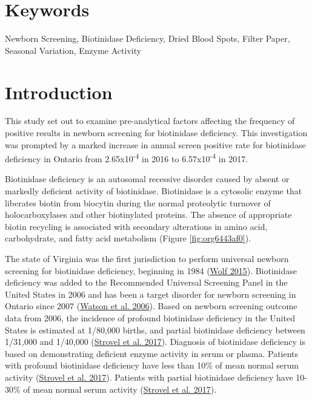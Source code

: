 \documentclass[review]{elsarticle}
\begin{document}
\section*{Keywords}
\label{sec:org08a5d07}
Newborn Screening, Biotinidase Deficiency, Dried Blood Spots, Filter
Paper, Seasonal Variation, Enzyme Activity
\section*{Introduction}
\label{sec:org8dc339e}
This study set out to examine pre-analytical factors affecting the
frequency of positive results in newborn screening for biotinidase
deficiency. This investigation was prompted by a marked increase in
annual screen positive rate for biotinidase deficiency in Ontario from
2.65x10\textsuperscript{-4} in 2016 to 6.57x10\textsuperscript{-4} in 2017.

Biotinidase deficiency is an autosomal recessive disorder caused by
absent or markedly deficient activity of biotinidase.  Biotinidase is
a cytosolic enzyme that liberates biotin from biocytin during the
normal proteolytic turnover of holocarboxylases and other biotinylated
proteins. The absence of appropriate biotin recycling is associated
with secondary alterations in amino acid, carbohydrate, and fatty acid
metabolism (Figure \ref{fig:org6443af0}).

The state of Virginia was the first jurisdiction to perform universal
newborn screening for biotinidase deficiency, beginning in 1984 (\hyperlink{citeproc_bib_item_11}{Wolf 2015}). Biotinidase deficiency was added to the Recommended
Universal Screening Panel in the United States in 2006 and has been a
target disorder for newborn screening in Ontario since 2007 (\hyperlink{citeproc_bib_item_9}{Watson et al. 2006}).  Based on newborn screening outcome data from
2006, the incidence of profound biotinidase deficiency in the United
States is estimated at 1/80,000 births, and partial biotinidase
deficiency between 1/31,000 and 1/40,000 (\hyperlink{citeproc_bib_item_6}{Strovel et al. 2017}). Diagnosis of biotinidase deficiency is based on
demonstrating deficient enzyme activity in serum or plasma. Patients
with profound biotinidase deficiency have less than 10\% of mean normal
serum activity (\hyperlink{citeproc_bib_item_6}{Strovel et al. 2017}). Patients with partial biotinidase
deficiency have 10-30\% of mean normal serum activity (\hyperlink{citeproc_bib_item_6}{Strovel et al. 2017}).
\end{document}
